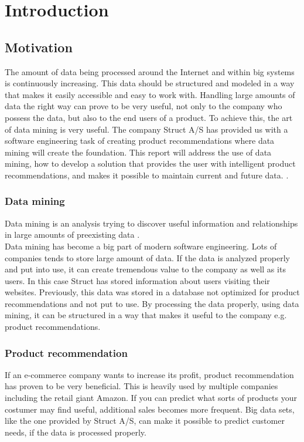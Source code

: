 
\chapter{Introduction} %

\label{ChapterX} %


\section{Motivation}
The amount of data being processed around the Internet and within big systems is continuously increasing. This data should be structured and modeled in a way that makes it easily accessible and easy to work with. Handling large amounts of data the right way can prove to be very useful, not only to the company who possess the data, but also to the end users of a product. To achieve this, the art of data mining is very useful.
The company Struct A/S \cite{Struct} has provided us with a software engineering task of creating product recommendations where data mining will create the foundation. This report will address the use of data mining, how to develop a solution that provides the user with intelligent product recommendations, and makes it possible to maintain current and future data. \cite{MongoSQL}.

\subsection{Data mining}
Data mining is an analysis trying to discover useful information and relationships in large amounts of preexisting data \cite{dataminingSource}. \\  
Data mining has become a big part of modern software engineering. Lots of companies tends to store large amount of data. If the data is analyzed properly and put into use, it can create tremendous value to the company as well as its users. In this case Struct has stored information about users visiting their websites. Previously, this data was stored in a database not optimized for product recommendations and not put to use. By processing the data properly, using data mining, it can be structured in a way that makes it useful to the company e.g. product recommendations.

\color{black}
\subsection{Product recommendation}
If an e-commerce company wants to increase its profit, product recommendation has proven to be very beneficial\cite{BigCommerce}. This is heavily used by multiple companies including the retail giant Amazon\cite{Fortune}. If you can predict what sorts of products your costumer may find useful, additional sales becomes more frequent. Big data sets, like the one provided by Struct A/S, can make it possible to predict customer needs, if the data is processed properly.
